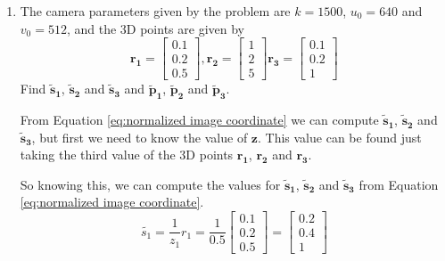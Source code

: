 \documentclass[12pt, letterpaper]{article}
\begin{document}
\begin{enumerate}
    \renewcommand{\labelenumi}{\alph{enumi})}
    \item The camera parameters given by the problem are 
    $k=1500$, $u_0=640$ and $v_0=512$, and the 3D points are given by
        \begin{equation*}
            \bm{r_1}=\begin{bmatrix}
                    0.1\\
                    0.2\\
                    0.5 
                    \end{bmatrix},
            \bm{r_2}=\begin{bmatrix}
                    1\\
                    2\\
                    5 
                    \end{bmatrix}
            \bm{r_3}=\begin{bmatrix}
                    0.1\\
                    0.2\\
                    1 
                    \end{bmatrix}
        \end{equation*}
        Find $\bm{\tilde{s}_1}$, $\bm{\tilde{s}_2}$ and $\bm{\tilde{s}_3}$ and $\bm{\tilde{p}_1}$, $\bm{\tilde{p}_2}$ and $\bm{\tilde{p}_3}$.
        
        From Equation \eqref{eq:normalized image coordinate} 
        we can compute $\bm{\tilde{s}_1}$, $\bm{\tilde{s}_2}$ and $\bm{\tilde{s}_3}$, 
        but first we need to know the value of $\bm{z}$. This value can be found just 
        taking the third value of the 3D points $\bm{r_1}$, $\bm{r_2}$ and $\bm{r_3}$.

        So knowing this, we can compute the values for $\bm{\tilde{s}_1}$, 
        $\bm{\tilde{s}_2}$ and $\bm{\tilde{s}_3}$ from Equation 
        \eqref{eq:normalized image coordinate}.
        \begin{equation*}
            {\tilde{s_1}=\frac{1}{z_1}r_1}=
            \frac{1}{0.5}\begin{bmatrix}
                        0.1\\
                        0.2\\
                        0.5 
                        \end{bmatrix}=
                        \begin{bmatrix}
                            0.2\\
                            0.4\\
                            1
                        \end{bmatrix}
        \end{equation*}


\end{enumerate}
\end{document}
